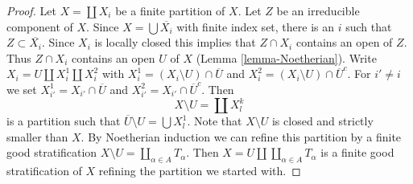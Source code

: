 \begin{proof}
Let $X = \coprod X_i$ be a finite partition of $X$.
Let $Z$ be an irreducible component of $X$. Since $X = \bigcup \overline{X_i}$
with finite index set, there is an $i$ such that
$Z \subset \overline{X_i}$. Since $X_i$ is locally closed this
implies that $Z \cap X_i$ contains an open of $Z$. Thus
$Z \cap X_i$ contains an open $U$ of $X$ (Lemma \ref{lemma-Noetherian}).
Write $X_i = U \amalg X_i^1 \amalg X_i^2$ with
$X_i^1 = (X_i \setminus U) \cap \overline{U}$ and
$X_i^2 = (X_i \setminus U) \cap \overline{U}^c$.
For $i' \not = i$ we set
$X_{i'}^1 = X_{i'} \cap \overline{U}$ and
$X_{i'}^2 = X_{i'} \cap \overline{U}^c$.
Then
$$
X \setminus U = \coprod X^k_l
$$
is a partition such that $\overline{U} \setminus U = \bigcup X_l^1$.
Note that $X \setminus U$ is closed and strictly smaller than $X$.
By Noetherian induction we can refine this partition
by a finite good stratification
$X \setminus U = \coprod_{\alpha \in A} T_\alpha$.
Then $X = U \amalg \coprod_{\alpha \in A} T_\alpha$ is a finite
good stratification of $X$ refining the partition we started with.
\end{proof}





















